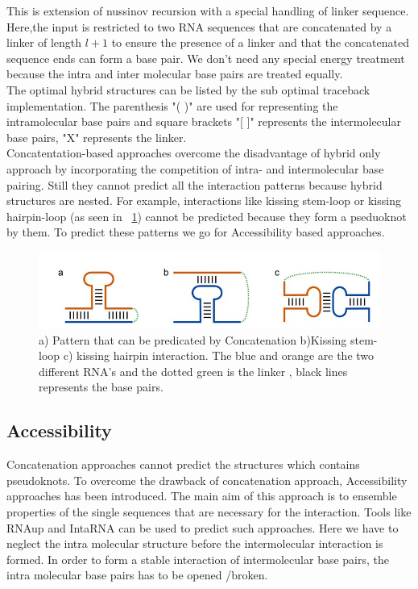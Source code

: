\documentclass[twoside,a4paper]{report}
\begin{document}
	This is extension of nussinov recursion with a special handling of linker sequence. Here,the input is restricted to two RNA sequences that are concatenated by a linker of length $l+1$  to ensure the presence of a linker and that the concatenated sequence ends can form a base pair. We don't need any special energy treatment because the intra and inter molecular base pairs are treated equally.\\
	The optimal hybrid structures can be listed by the sub optimal traceback implementation. The parenthesis "( )" are used for representing the intramolecular base pairs and square brackets "[ ]" represents the  intermolecular base pairs, "X" represents the linker. \\
	
	Concatentation-based approaches overcome the disadvantage of hybrid only approach by incorporating the competition of intra- and intermolecular base pairing. Still they cannot predict all the interaction patterns because  hybrid structures are nested. For example, interactions like kissing stem-loop or kissing hairpin-loop (as seen in ~\ref{fig:concat}) cannot be predicted because they form a pseduoknot by them. To predict these patterns we go for Accessibility based approaches.\\
	 \begin{figure}[H]
		\includegraphics[width=0.9\linewidth]{concat}
		\centering
		\caption{a) Pattern that can be predicated by Concatenation b)Kissing stem-loop c) kissing hairpin interaction. The blue and orange are the two different RNA's and the dotted green is the linker , black lines represents the base pairs. } 
		\label{fig:concat}
	\end{figure}
	
	
	\subsection{Accessibility}
	Concatenation approaches cannot predict the structures which contains pseudoknots. To overcome the drawback of concatenation approach, Accessibility approaches has been introduced. The main aim of this approach is to ensemble properties of the single sequences that are necessary for the interaction. Tools like RNAup and IntaRNA can be used to predict such approaches. Here we have to neglect the intra molecular structure before the intermolecular interaction is formed. In order to form a stable interaction of intermolecular base pairs, the intra molecular base pairs has to be opened /broken. \\
	
\end{document}
